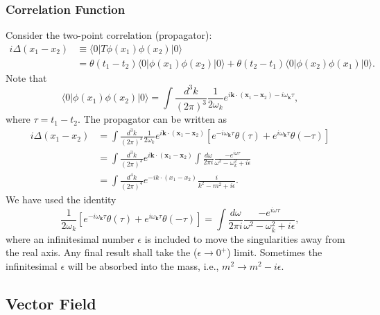 \subsubsection{Correlation Function}
Consider the two-point correlation (propagator):
\begin{equation}
\begin{aligned}
	i\Delta(x_1-x_2) &\equiv \langle 0|T \phi(x_1) \phi(x_2) |0\rangle \\
	&= \theta(t_1-t_2) \langle 0|\phi(x_1) \phi(x_2) |0\rangle 
	+ \theta(t_2-t_1) \langle 0|\phi(x_2) \phi(x_1) |0\rangle.
\end{aligned}
\end{equation}
Note that
\begin{equation}
	\langle 0|\phi(x_1) \phi(x_2) |0\rangle
	= \int\frac{d^{3} k}{(2\pi)^{3}}\frac{1}{2\omega_k} e^{i\bm k\cdot (\bm x_1-\bm x_2)-i\omega_{\bm k}\tau},
\end{equation}
where $\tau =t_1-t_2$.
The propagator can be written as
\begin{equation}
\begin{aligned}
	i\Delta(x_1-x_2) 
	&= \int\frac{d^{3} k}{(2\pi)^{3}}\frac{1}{2\omega_k} e^{i\bm k\cdot (\bm x_1-\bm x_2)}\left[e^{-i\omega_{\bm k}\tau}\theta(\tau)+e^{i\omega_{\bm k}\tau}\theta(-\tau)\right] \\
	&= \int\frac{d^{3} k}{(2\pi)^{3}} e^{i\bm k\cdot (\bm x_1-\bm x_2)}\int \frac{d\omega}{2\pi i}\frac{-e^{i\omega\tau}}{\omega^2-\omega_k^2+i\epsilon} \\
	&= \int\frac{d^{4} k}{(2\pi)^{4}} e^{-i k\cdot (x_1-x_2)}\frac{i}{k^2-m^2+i\epsilon}.
\end{aligned}
\end{equation}
We have used the identity
\begin{equation*}
	\frac{1}{2\omega_k} \left[e^{-i\omega_{\bm k}\tau}\theta(\tau)+e^{i\omega_{\bm k}\tau}\theta(-\tau)\right] 
	= \int \frac{d\omega}{2\pi i} \frac{-e^{i\omega\tau}}{\omega^2-\omega_k^2+i\epsilon},
\end{equation*}
where an infinitesimal number $\epsilon$ is included to move the singularities away from the real axis.
Any final result shall take the ($\epsilon \rightarrow 0^+$) limit.
Sometimes the infinitesimal $\epsilon$ will be absorbed into the mass, i.e., $m^2 \rightarrow m^2-i\epsilon$.


\subsection{Vector Field}


